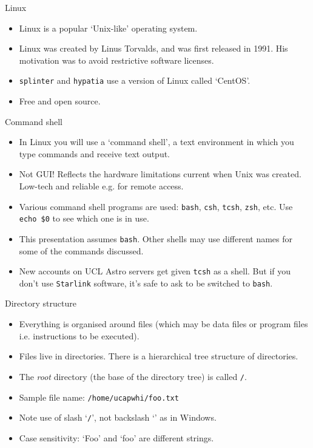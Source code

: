 \documentclass[dvipsnames]{beamer}
\newcommand{\command}[1]{\colorbox{light-gray}{\texttt{#1}}}
\newcommand{\filename}[1]{\colorbox{light-green}{\texttt{#1}}}
\newcommand{\server}[1]{\textcolor{BrickRed}{\texttt{#1}}}
\begin{document}
\begin{frame}{Linux}
  \begin{itemize}
    \item Linux is a popular `Unix-like' operating system.
    \item Linux was created by  Linus Torvalds, and was first released in 1991. His motivation was to avoid restrictive software licenses.
    \item \server{splinter} and \server{hypatia} use a version of Linux called `CentOS'.
    \item Free and open source.
   \end{itemize}
\end{frame}


\begin{frame}{Command shell}
  \begin{itemize}
    \item In Linux you will use a `command shell', a text environment in which you type commands and receive text output.
    \item Not GUI! Reflects the hardware limitations current when Unix was created. Low-tech and reliable e.g. for remote access.
    \item Various command shell programs are used: \command{bash}, \command{csh}, \command{tcsh}, \command{zsh}, etc. Use \command{echo \$0} to see which one is in use.
    \item This presentation assumes \command{bash}. Other shells may use different names for some of the commands discussed.
    \item New accounts on UCL Astro servers get given \command{tcsh} as a shell. But if you don't use \texttt{Starlink} software, it's safe to ask to be switched to \command{bash}.
   \end{itemize}
\end{frame}


\begin{frame}{Directory structure}
  \begin{itemize}
    \item Everything is organised around files (which may be data files or program files i.e. instructions to be executed).
    \item Files live in directories. There is a hierarchical tree structure of directories.
    \item The \textit{root} directory (the base of the directory tree) is called \filename{/}.
    \item Sample file name: \filename{/home/ucapwhi/foo.txt}
    \item Note use of slash `\texttt{/}', not backslash `\texttt{}' as in Windows.
    \item Case sensitivity: `Foo' and `foo' are different strings.
  \end{itemize}
\end{frame}
\end{document}
